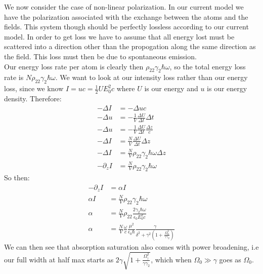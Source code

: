 We now consider the case of non-linear polarization. In our current model we have the polarization associated with the exchange between the atoms and the fields. This system though should be perfectly lossless according to our current model.
In order to get loss we have to assume that all energy lost must be scattered into a direction other than the propogation along the same direction as the field. This loss must then be due to spontaneous emission.\\
Our energy loss rate per atom is clearly then $\rho_{22}\gamma_2\hbar\omega$, so the total energy loss rate is $N\rho_{22}\gamma_2\hbar\omega$.
We want to look at our intensity loss rather than our energy loss, since we know $I = uc =\frac{1}{2} UE_0^2 c$ where $U$ is our energy and $u$ is our energy density. Therefore:
\begin{align*}
	-\Delta I &= -\Delta u c \\
	-\Delta u &= -\frac{1}{V} \frac{\Delta U}{\Delta t}\Delta t \\
	-\Delta u &= -\frac{1}{V} \frac{\Delta U}{\Delta t}\frac{\Delta z}{c} \\
	-\Delta I &= \frac{N}{V} \frac{\Delta U}{\Delta t}\Delta z \\
	-\Delta I &= \frac{N}{V} \rho_{22}\gamma_2\hbar\omega\Delta z \\
	-\partial_z I &= \frac{N}{V} \rho_{22}\gamma_2\hbar\omega
\end{align*}
So then:
\begin{align*}
	-\partial_z I &= \alpha I \\
	\alpha I &= \frac{N}{V} \rho_{22}\gamma_2\hbar\omega\\
	\alpha &= \frac{N}{V} \rho_{22}\frac{2\gamma_2\hbar\omega}{\epsilon_0E_0^2 c}\\
	\alpha &= \frac{N}{V} \frac{\omega}{c} \frac{\mu^2}{\epsilon_0\hbar} \frac{\gamma}{\delta^2 + \gamma^2\left(1 + \frac{\Omega_0^2}{\gamma\gamma_2}\right)} 
\end{align*}
We can then see that absorption saturation also comes with power broadening, i.e our full width at half max starts as $2\gamma\sqrt{1+ \frac{\Omega_)^2}{\gamma\gamma_2}}$, which when $\Omega_0 \gg \gamma$ goes as $\Omega_0$.
